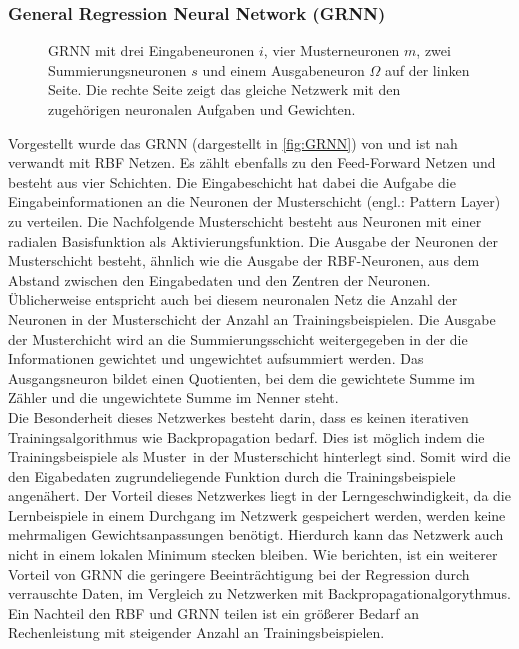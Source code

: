 \subsubsection{General Regression Neural Network (GRNN)}
\begin{figure}[!htb]
    \centering
        
    \caption[Darstellung eines GRNN]{GRNN mit drei Eingabeneuronen $i$, vier Musterneuronen $m$, zwei Summierungsneuronen $s$ und einem Ausgabeneuron $\Omega$  auf der linken Seite. Die rechte Seite zeigt das gleiche Netzwerk mit den zugehörigen neuronalen Aufgaben und Gewichten.}
    \label{fig:GRNN}
\end{figure}

Vorgestellt wurde das \gls{GRNN} (dargestellt in \autoref{fig:GRNN}) von \citet{Specht1991} und ist nah verwandt mit RBF Netzen. Es zählt ebenfalls zu den Feed-Forward Netzen und besteht aus vier Schichten. Die Eingabeschicht hat dabei die Aufgabe die Eingabeinformationen an die Neuronen der Musterschicht (engl.: Pattern Layer) zu verteilen. Die Nachfolgende Musterschicht besteht aus Neuronen mit einer radialen Basisfunktion als Aktivierungsfunktion. Die Ausgabe der Neuronen der Musterschicht besteht, ähnlich wie die Ausgabe der RBF-Neuronen, aus dem Abstand zwischen den Eingabedaten und den Zentren der Neuronen. Üblicherweise entspricht auch bei diesem neuronalen Netz die Anzahl der Neuronen in der Musterschicht der Anzahl an Trainingsbeispielen. Die Ausgabe der Musterchicht wird an die Summierungsschicht weitergegeben in der die Informationen gewichtet und ungewichtet aufsummiert werden. Das Ausgangsneuron bildet einen Quotienten, bei dem die gewichtete Summe im Zähler und die ungewichtete Summe im Nenner steht.\\
Die Besonderheit dieses Netzwerkes besteht darin, dass es keinen iterativen Trainingsalgorithmus wie Backpropagation bedarf. Dies ist möglich indem die Trainingsbeispiele als \glqq Muster\grqq~in der Musterschicht hinterlegt sind. Somit wird die den Eigabedaten zugrundeliegende Funktion durch die Trainingsbeispiele angenähert. %
Der Vorteil dieses Netzwerkes liegt in der Lerngeschwindigkeit, da die Lernbeispiele in einem Durchgang im Netzwerk gespeichert werden, werden keine mehrmaligen Gewichtsanpassungen benötigt. Hierdurch kann das Netzwerk auch nicht in einem lokalen Minimum stecken bleiben. Wie \citet{Marqueza1993} berichten, ist ein weiterer Vorteil von GRNN die geringere Beeinträchtigung bei der Regression durch verrauschte Daten, im Vergleich zu Netzwerken mit Backpropagationalgorythmus.
Ein Nachteil den RBF und GRNN teilen ist ein größerer Bedarf an Rechenleistung mit steigender Anzahl an Trainingsbeispielen.  


